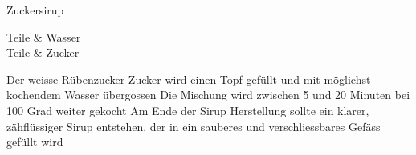 \begin{recipe}
	[
	preparationtime = {\unit[25]{min}},
	bakingtime,
	bakingtemperature,
	portion = {\portion{1}},
	calory,
	source
	]
	{Zuckersirup}
	
	\graph
	{
	}
	
	\ingredients
	{
		\unit[2]{Teile} & Wasser \\
		\unit[3]{Teile} & Zucker
	}
	
	\preparation
	{
		\step Der weisse Rübenzucker Zucker wird einen Topf gefüllt und mit möglichst kochendem Wasser übergossen
		\step Die Mischung wird zwischen 5 und 20 Minuten bei 100 Grad weiter gekocht
		\step Am Ende der Sirup Herstellung sollte ein klarer, zähflüssiger Sirup entstehen, der in ein sauberes und verschliessbares Gefäss gefüllt wird
	}
	
\end{recipe}